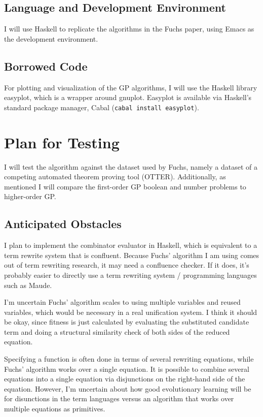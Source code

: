 \documentclass{article}
\begin{document}
\subsection{Language and Development Environment}

I will use Haskell to replicate the algorithms in the Fuchs paper,
using Emacs as the development environment. 

\subsection{Borrowed Code}

For plotting and visualization of the GP algorithms, I will use the
Haskell library easyplot, which is a wrapper around gnuplot. Easyplot
is available via Haskell's standard package manager, Cabal
(\texttt{cabal install easyplot}).

\section{Plan for Testing}

I will test the algorithm against the dataset used by Fuchs, namely a
dataset of a competing automated theorem proving tool (OTTER).
Additionally, as mentioned I will compare the first-order GP boolean
and number problems to higher-order GP.

\subsection{Anticipated Obstacles}

I plan to implement the combinator evaluator in Haskell, which is
equivalent to a term rewrite system that is confluent. Because Fuchs'
algorithm I am using comes out of term rewriting research, it may need
a confluence checker. If it does, it's probably easier to directly use
a term rewriting system / programming languages such as Maude.

I'm uncertain Fuchs' algorithm scales to using
multiple variables and reused variables, which would be necessary in a
real unification system. I think it should be okay, since fitness is
just calculated by evaluating the substituted candidate term and doing
a structural similarity check of both sides of the reduced equation.

Specifying a function is often done in terms of several rewriting
equations, while Fuchs' algorithm works over a single equation. It is
possible to combine several equations into a single equation via
disjunctions on the right-hand side of the equation. However, I'm
uncertain about how good evolutionary learning will be for disunctions
in the term languages versus an algorithm that works over multiple
equations as primitives.
\end{document}
